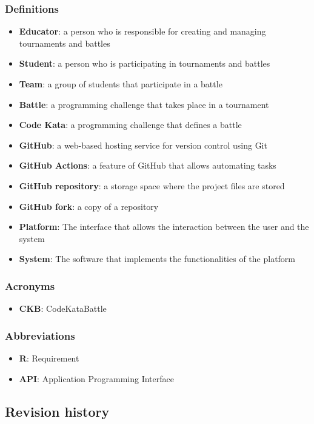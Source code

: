 \subsubsection{Definitions}
\begin{itemize}
    \item \textbf{Educator}: a person who is responsible for creating and managing tournaments and battles
    \item \textbf{Student}: a person who is participating in tournaments and battles
    \item \textbf{Team}: a group of students that participate in a battle
    \item \textbf{Battle}: a programming challenge that takes place in a tournament
    \item \textbf{Code Kata}: a programming challenge that defines a battle
    \item \textbf{GitHub}: a web-based hosting service for version control using Git
    \item \textbf{GitHub Actions}: a feature of GitHub that allows automating tasks
    \item \textbf{GitHub repository}: a storage space where the project files are stored
    \item \textbf{GitHub fork}: a copy of a repository
    \item \textbf{Platform}: The interface that allows the interaction between the user and the system
    \item \textbf{System}: The software that implements the functionalities of the platform
\end{itemize}
\subsubsection{Acronyms}
\begin{itemize}
    \item \textbf{CKB}: CodeKataBattle
\end{itemize}
\subsubsection{Abbreviations}
\begin{itemize}
    \item \textbf{R}: Requirement
    \item \textbf{API}: Application Programming Interface
\end{itemize}
\subsection{Revision history}

